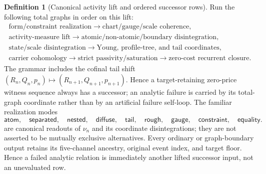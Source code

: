 \documentclass[11pt]{article}
\numberwithin{section}{part}
\theoremstyle{plain}
\theoremstyle{definition}
\newtheorem{definition}[definition]{Definition}
\theoremstyle{remark}
\begin{document}
\begin{definition}[Canonical activity lift and ordered successor rows]
Run the following total graphs in order on this lift:
\begin{equation}
 \label{eq:ordered-successor-rows}
 \begin{gathered}
 \text{form/constraint realization}
 \longrightarrow \text{chart/gauge/scale coherence},\\
 \text{activity-measure lift}
 \longrightarrow \text{atomic/non-atomic/boundary disintegration},\\
 \text{state/scale disintegration}
 \longrightarrow \text{Young, profile-tree, and tail coordinates},\\
 \text{carrier cohomology}
 \longrightarrow \text{strict passivity/saturation}
 \longrightarrow \text{zero-cost recurrent closure}.
 \end{gathered}
\end{equation}
The grammar includes the cofinal tail shift
\((R_n,Q_n,p_n)\mapsto(R_{n+1},Q_{n+1},p_{n+1})\).  Hence a target-retaining zero-price
witness sequence always has a successor; an analytic failure is carried by
its total-graph coordinate rather than by an artificial failure self-loop.
The familiar realization modes
\begin{equation}
 \label{eq:successor-realization-modes}
 \mathsf{atom},\quad\mathsf{separated},\quad\mathsf{nested},\quad
 \mathsf{diffuse},\quad\mathsf{tail},\quad\mathsf{rough},\quad
 \mathsf{gauge},\quad\mathsf{constraint},\quad\mathsf{equality}.
\end{equation}
are canonical readouts of \(\nu_n\) and its coordinate disintegrations; they
are not asserted to be mutually exclusive alternatives.  Every ordinary or
graph-boundary output retains its five-channel ancestry, original event index,
and target floor.  Hence a failed analytic relation is immediately
another lifted successor input, not an unevaluated row.
\end{definition}
\end{document}

